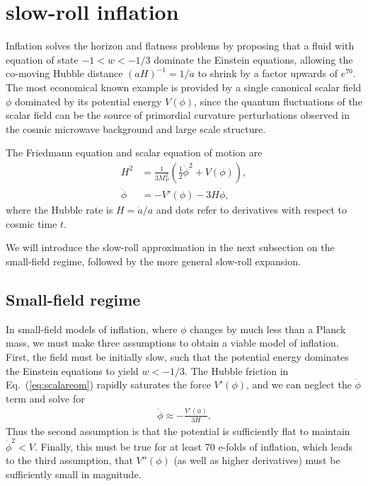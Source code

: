 \documentclass[aps,amsfonts,amsmath,prd,preprint,nofootinbib,superscriptaddress]{revtex4}
\newcommand{\MMp}{{M_P^2}}
\begin{document}
\section{slow-roll inflation}
Inflation solves the horizon and flatness problems by proposing that a fluid with equation of state $-1< w < -1/3$ dominate the Einstein equations, allowing the co-moving Hubble distance $(a H)^{-1} = 1/\dot a$ to
shrink by a factor upwards of $e^{70}$. The most economical known example is provided by a single canonical scalar field $\phi$ dominated by its potential energy $V(\phi)$, since the quantum fluctuations of the scalar field can be the source of primordial curvature perturbations observed in the cosmic microwave background and large scale structure. 
 
The Friedmann equation and scalar equation of motion are
\begin{align}
H^2 &= \frac{1}{3\MMp}\left(\tfrac{1}{2}\dot\phi^2 + V(\phi)\right),\\
\ddot \phi &= -V'(\phi) - 3 H \dot \phi,\label{eq:scalareom}
\end{align}
where the Hubble rate is $H = \dot a/a$ and dots refer to derivatives with respect to cosmic time $t$.  


We will introduce the slow-roll approximation in the next subsection on  the small-field regime, followed by the more general
slow-roll expansion.



\subsection{Small-field regime}
In small-field models of inflation, where $\phi$ changes by much less than a Planck mass,
we must make three assumptions to obtain a viable model of inflation.  
First, the field must be initially slow, such that the potential energy dominates the Einstein equations to yield $w < -1/3$.
The Hubble friction in Eq.~(\ref{eq:scalareom}) rapidly saturates the force $V'(\phi)$, and we can neglect the $\ddot\phi$ term and solve for 
\begin{align}
\dot\phi \approx -\frac{V'(\phi)}{3 H}.
\end{align}
Thus the second assumption is that the potential is sufficiently flat to maintain $\dot\phi^2 < V$.
Finally, this must be true for at least 70 e-folds of inflation, which leads to the third assumption, 
that $V''(\phi)$ (as well as higher derivatives) must be sufficiently small in magnitude.
\end{document}

